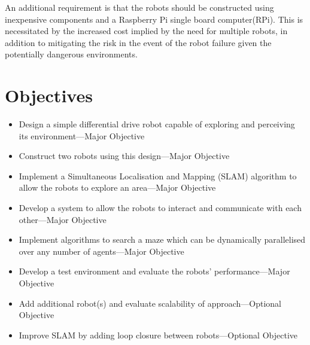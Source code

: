 An additional requirement is that the robots should be constructed using
inexpensive components and a Raspberry Pi single board computer(RPi). This is necessitated by the increased cost implied
by the need for multiple robots, in addition to mitigating the risk in the 
event of the robot failure given the potentially dangerous environments.

\section{Objectives}\label{introduction/objectives}
\begin{itemize}
\item{Design a simple differential drive robot capable of exploring and perceiving its environment---Major Objective}
    \item{Construct two robots using this design---Major Objective}
    \item{Implement a Simultaneous Localisation and Mapping (SLAM) algorithm to allow the robots to explore an area---Major Objective}
    \item{Develop a system to allow the robots to interact and communicate with each other---Major Objective}
    \item{Implement algorithms to search a maze which can be dynamically parallelised over any number of agents---Major Objective}
    \item{Develop a test environment and evaluate the robots’ performance---Major Objective}
    \item{Add additional robot(s) and evaluate scalability of approach---Optional Objective}
    \item{Improve SLAM by adding loop closure between robots---Optional Objective}
\end{itemize}
